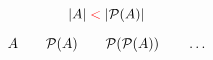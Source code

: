 

\begin{frame}{}
  \begin{theorem}
    \[
      |A| \;\textcolor{red}{<}\; |\mathcal{P}(A)|
    \]
  \end{theorem}

  \pause
  \[
    A \qquad \mathcal{P}(A) \qquad \mathcal{P}(\mathcal{P}(A)) \qquad \ldots
  \]

  \pause
  \vspace{0.60cm}
  \begin{center}
  \end{center}
\end{frame}
